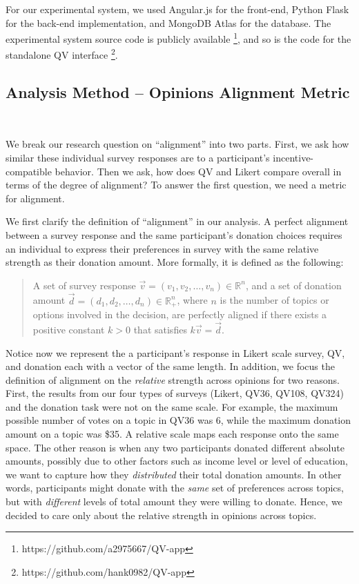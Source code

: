 For our experimental system, we used Angular.js for the front-end, Python Flask for the back-end implementation, and MongoDB Atlas for the database. The experimental system source code is publicly available \footnote{https://github.com/a2975667/QV-app}, and so is the code for the standalone QV interface \footnote{https://github.com/hank0982/QV-app}. 

\subsection{Analysis Method -- Opinions Alignment Metric}~\label{alignment_metric}

We break our research question on ``alignment'' into two parts. First, we ask how similar these individual survey responses are to a participant's incentive-compatible behavior. Then we ask, how does QV and Likert compare overall in terms of the degree of alignment? To answer the first question, we need a metric for alignment.

We first clarify the definition of ``alignment'' in our analysis. A perfect alignment between a survey response and the same participant's donation choices requires an individual to express their preferences in survey with the same relative strength as their donation amount. More formally, it is defined as the following:

\begin{quote}
    A set of survey response $\vec{v} = (v_1, v_2, \dots, v_n) \in \mathbb{R}^n$, and a set of donation amount $\vec{d} = (d_1, d_2, \dots, d_n)\in \mathbb{R}_{+}^n$, where $n$ is the number of topics or options involved in the decision, are perfectly aligned if there exists a positive constant $k>0$ that satisfies $k\vec{v} = \vec{d}$.
\end{quote}

Notice now we represent the a participant's response in Likert scale survey, QV, and donation each with a vector of the same length. In addition, we focus the definition of alignment on the \textit{relative} strength across opinions for two reasons. First, the results from our four types of surveys (Likert, QV36, QV108, QV324) and the donation task were not on the same scale. For example, the maximum possible number of votes on a topic in QV36 was 6, while the maximum donation amount on a topic was \$35. A relative scale maps each response onto the same space. The other reason is when any two participants donated different absolute amounts, possibly due to other factors such as income level or level of education, we want to capture how they \textit{distributed} their total donation amounts. In other words, participants might donate with the \textit{same} set of preferences across topics, but with \textit{different} levels of total amount they were willing to donate. Hence, we decided to care only about the relative strength in opinions across topics.

